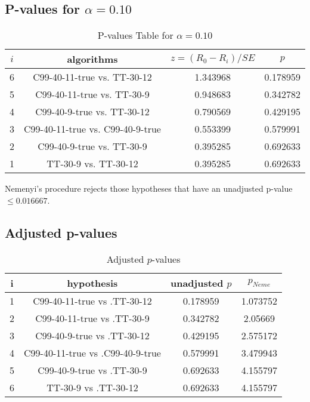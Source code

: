 \documentclass[a4paper,10pt]{article}
\begin{document}
\begin{landscape}
\pagebreak

\subsection{P-values for $\alpha=0.10$}

\begin{table}[!htp]
\centering\scriptsize
\begin{tabular}{cccc}
$i$&algorithms&$z=(R_0 - R_i)/SE$&$p$\\
\hline6&C99-40-11-true vs. TT-30-12&1.343968&0.178959\\
5&C99-40-11-true vs. TT-30-9&0.948683&0.342782\\
4&C99-40-9-true vs. TT-30-12&0.790569&0.429195\\
3&C99-40-11-true vs. C99-40-9-true&0.553399&0.579991\\
2&C99-40-9-true vs. TT-30-9&0.395285&0.692633\\
1&TT-30-9 vs. TT-30-12&0.395285&0.692633\\
\hline
\end{tabular}
\caption{P-values Table for $\alpha=0.10$}
\end{table}Nemenyi's procedure rejects those hypotheses that have an unadjusted p-value $\le0.016667$.

\pagebreak

\subsection{Adjusted p-values}

\begin{table}[!htp]
\centering\scriptsize
\begin{tabular}{cccc}
i&hypothesis&unadjusted $p$&$p_{Neme}$\\
\hline1&C99-40-11-true vs .TT-30-12&0.178959&1.073752\\
2&C99-40-11-true vs .TT-30-9&0.342782&2.05669\\
3&C99-40-9-true vs .TT-30-12&0.429195&2.575172\\
4&C99-40-11-true vs .C99-40-9-true&0.579991&3.479943\\
5&C99-40-9-true vs .TT-30-9&0.692633&4.155797\\
6&TT-30-9 vs .TT-30-12&0.692633&4.155797\\
\hline
\end{tabular}
\caption{Adjusted $p$-values}
\end{table}

\end{landscape}
\end{document}
